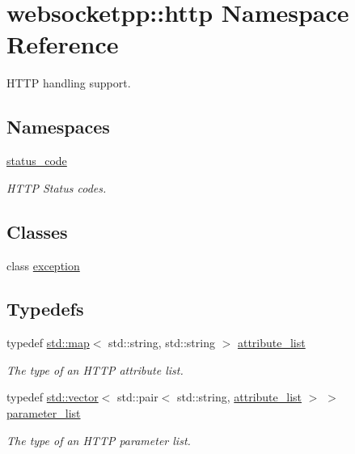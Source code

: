\hypertarget{namespacewebsocketpp_1_1http}{}\section{websocketpp\+:\+:http Namespace Reference}
\label{namespacewebsocketpp_1_1http}


H\+T\+TP handling support.  


\subsection*{Namespaces}
\begin{DoxyCompactItemize}
\item 
 \mbox{\hyperlink{namespacewebsocketpp_1_1http_1_1status__code}{status\+\_\+code}}
\begin{DoxyCompactList}\small\item\em H\+T\+TP Status codes. \end{DoxyCompactList}\end{DoxyCompactItemize}
\subsection*{Classes}
\begin{DoxyCompactItemize}
\item 
class \mbox{\hyperlink{classwebsocketpp_1_1http_1_1exception}{exception}}
\end{DoxyCompactItemize}
\subsection*{Typedefs}
\begin{DoxyCompactItemize}
\item 
typedef \mbox{\hyperlink{classstd_1_1map}{std\+::map}}$<$ std\+::string, std\+::string $>$ \mbox{\hyperlink{namespacewebsocketpp_1_1http_a9744f4104772b987aa9e86c35ce1357b}{attribute\+\_\+list}}
\begin{DoxyCompactList}\small\item\em The type of an H\+T\+TP attribute list. \end{DoxyCompactList}\item 
typedef \mbox{\hyperlink{classstd_1_1vector}{std\+::vector}}$<$ std\+::pair$<$ std\+::string, \mbox{\hyperlink{namespacewebsocketpp_1_1http_a9744f4104772b987aa9e86c35ce1357b}{attribute\+\_\+list}} $>$ $>$ \mbox{\hyperlink{namespacewebsocketpp_1_1http_a2c285bc959df5a63bf962bed842fccfb}{parameter\+\_\+list}}
\begin{DoxyCompactList}\small\item\em The type of an H\+T\+TP parameter list. \end{DoxyCompactList}\end{DoxyCompactItemize}
